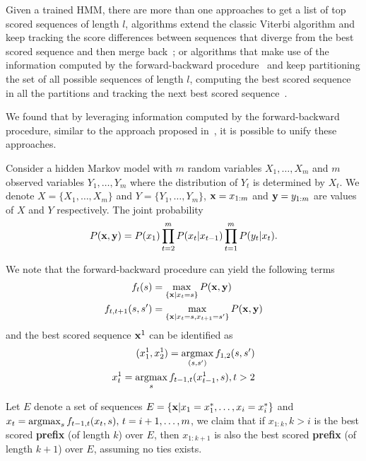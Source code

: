 Given a trained HMM, there are more than one approaches to get a list of top scored sequences of length $l$, 
\eg algorithms extend the classic Viterbi algorithm and keep tracking the score differences between sequences 
that diverge from the best scored sequence and then merge back~\cite{seshadri1994list,nill1995list};
or algorithms that make use of the information computed by the forward-backward procedure~\cite{rabiner1989tutorial}
and keep partitioning the set of all possible sequences of length $l$, computing the best scored sequence in all the partitions
and tracking the next best scored sequence~\cite{nilsson2001sequentially}.

We found that by leveraging information computed by the forward-backward procedure, similar to the approach proposed in~\cite{nilsson2001sequentially},
it is possible to unify these approaches.

Consider a hidden Markov model with $m$ random variables $X_1, \dots, X_m$ and $m$ observed variables $Y_1, \dots, Y_m$
where the distribution of $Y_t$ is determined by $X_t$.
We denote $X = \{X_1, \dots, X_m\}$ and $Y = \{Y_1, \dots, Y_m\}$, 
$\mathbf{x} = x_{1:m}$ and $\mathbf{y} = y_{1:m}$ are values of $X$ and $Y$ respectively.
The joint probability 
\begin{equation}
\label{eq:joint}
P(\mathbf{x}, \mathbf{y}) = P(x_1) \prod_{t=2}^m P(x_t |x_{t-1}) \prod_{t=1}^m P(y_t |x_t).
\end{equation}

We note that the forward-backward procedure can yield the following terms 
\begin{align}
\label{eq:basic}
f_t(s)           &= \max_{\{\mathbf{x}|x_t = s\}} P(\mathbf{x}, \mathbf{y}) \\
f_{t,t+1}(s, s') &= \max_{\{\mathbf{x}|x_t = s, x_{t+1} = s'\}} P(\mathbf{x}, \mathbf{y})
\end{align}
and the best scored sequence $\mathbf{x}^1$ can be identified as
\begin{align*}
(x_1^1, x_2^1) = \operatorname*{argmax}_{(s, s')} f_{1,2}(s, s') \\
x_t^1 = \operatorname*{argmax}_{s} f_{t-1, t}(x_{t-1}^1, s), t > 2
\end{align*}

\begin{lemma}
\label{lemma1}
Let $E$ denote a set of sequences $E = \{\mathbf{x} |x_1 = x_1^*, \dots, x_i = x_i^*\}$ and
$x_t = \operatorname*{argmax}_{s} f_{t-1, t}(x_t, s), \, t = i+1,\dots,m$, 
we claim that if $x_{1:k}, k > i$ is the best scored \textbf{prefix} (of length $k$) over $E$, 
then $x_{1:k+1}$ is also the best scored \textbf{prefix} (of length $k+1$) over $E$,
assuming no ties exists.
\end{lemma}

